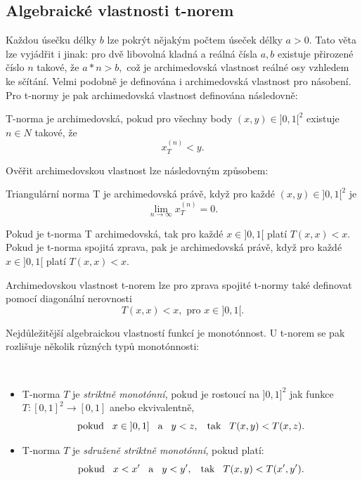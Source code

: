 \subsection{Algebraick\'e vlastnosti t-norem}

Každou \' usečku délky $b$ lze pokrýt nějakým počtem \' useček délky $a > 0.$ Tato věta lze vyjádřit i jinak: pro dvě libovolná kladná a reálná čísla $a,b$ existuje přirozené číslo $n$ takové, že $a*n>b,$ což je archimedovská vlastnost reálné osy vzhledem ke sčítání. Velmi podobně je definována i archimedovská vlastnost pro násobení. Pro t-normy je pak archimedovská vlastnost definována následovně:
\begin{definition}
\cite{KMP}
    T-norma je archimedovská, pokud pro všechny body $(x,y) \in ]0,1[^2$ existuje $n \in N$ takové, že $$x_T^{(n)} < y.$$
\end{definition}
Ověřit archimedovskou vlastnost lze následovným zp\r usobem:
\begin{sentence} \cite{KMP}
    Triangulární norma T je archimedovská právě, když pro každé $(x,y) \in ]0,1[^2$ je $$\lim_{n \to \infty}x_T^{(n)} = 0.$$
\end{sentence}
\begin{sentence} \cite{KMP}
    Pokud je t-norma T archimedovská, tak pro každé $x \in ]0,1[$ platí $T(x,x) < x.$\\
    Pokud je t-norma spojitá zprava, pak je archimedovská právě, když pro každé $x \in ]0,1[$ platí $T(x,x) < x.$
\end{sentence}

    Archimedovskou vlastnost t-norem lze pro zprava spojit\'e t-normy také definovat pomocí diagonální nerovnosti $$T(x,x) < x, \mbox{ pro } x \in ]0,1[.$$

    Nejd\r uležitější algebraickou vlastností funkcí je monot\' onnost. U t-norem se pak rozlišuje několik r\r uzných typ\r u monot\' onnosti:
    \begin{definition}
    \cite{KMP}\\
        \begin{itemize}
            \item T-norma $T$ je {\em striktně
            monot\' onní}, pokud
            je rostoucí na $]0,1]^2$ jak funkce $ T:[0,1]^2 \rightarrow [0,1]$ anebo
            ekvivalentně,
            $$ \text {pokud} \hskip 3mm x \in \hskip 1mm ]0,1] \hskip 3mm \text{a} \hskip 3mm y < z, \hskip 3mm \text {tak} \hskip 3mm T(x,y) < T(x,z). $$
            \item  T-norma $T$ je {\em sdruženě striktně
            monot\' onní}, pokud platí:
            $$ \text{pokud} \hskip 3mm  x < x'\hskip 3mm \text{a} \hskip 3mm y<y',
            \hskip 3mm  \text{tak} \hskip 3mm   T(x,y)<T(x',y').$$
            \end{itemize}
    \end{definition}

